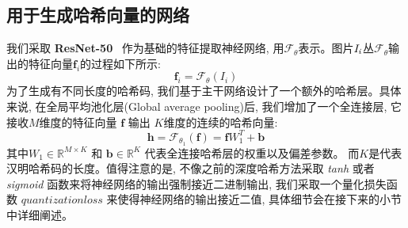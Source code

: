 \subsection{用于生成哈希向量的网络}
我们采取 \textbf{ResNet-50}~\cite{he2016deep} 作为基础的特征提取神经网络, 用$\mathcal{F}_{\theta}$表示。图片$\it{I}_i$丛$\mathcal{F}_{\theta}$输出的特征向量$\mathbf{f}_i$的过程如下所示:
\begin{equation}
    \mathbf{f}_i = \mathcal{F}_{\theta}(I_i)
\end{equation}
为了生成有不同长度的哈希码, 我们基于主干网络设计了一个额外的哈希层。具体来说, 在全局平均池化层(Global average pooling)后, 我们增加了一个全连接层, 它接收$M$维度的特征向量 $\mathbf{f}$ 输出 $K$维度的连续的哈希向量:
\begin{equation}
    \mathbf{h} = \mathcal{F}_{\theta_1}(\mathbf{f}) = \mathbf{f}W_1^T + \textbf{b}
\end{equation}
其中$W_1 \in \mathbb{R}^{M\times K}$ 和 $\mathbf{b} \in \mathbb{R}^{K}$ 代表全连接哈希层的权重以及偏差参数。 而$K$是代表汉明哈希码的长度。值得注意的是, 不像之前的深度哈希方法采取 \textit{tanh} 或者 \textit{sigmoid} 函数来将神经网络的输出强制接近二进制输出, 我们采取一个量化损失函数 $quantization loss$ 来使得神经网络的输出接近二值, 具体细节会在接下来的小节中详细阐述。
